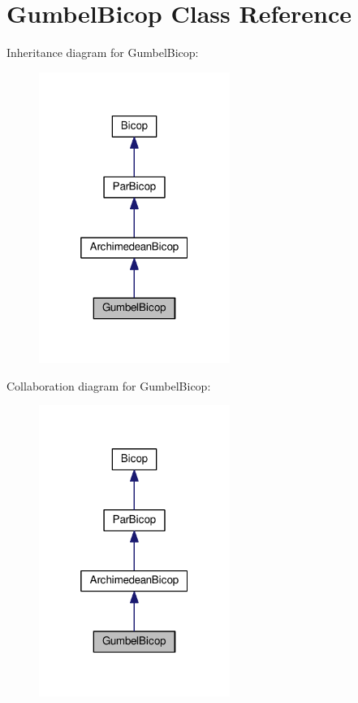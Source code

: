 \hypertarget{class_gumbel_bicop}{\section{Gumbel\+Bicop Class Reference}
\label{class_gumbel_bicop}
}


Inheritance diagram for Gumbel\+Bicop\+:\nopagebreak
\begin{figure}[H]
\begin{center}
\leavevmode
\includegraphics[width=176pt]{class_gumbel_bicop__inherit__graph}
\end{center}
\end{figure}


Collaboration diagram for Gumbel\+Bicop\+:\nopagebreak
\begin{figure}[H]
\begin{center}
\leavevmode
\includegraphics[width=176pt]{class_gumbel_bicop__coll__graph}
\end{center}
\end{figure}
